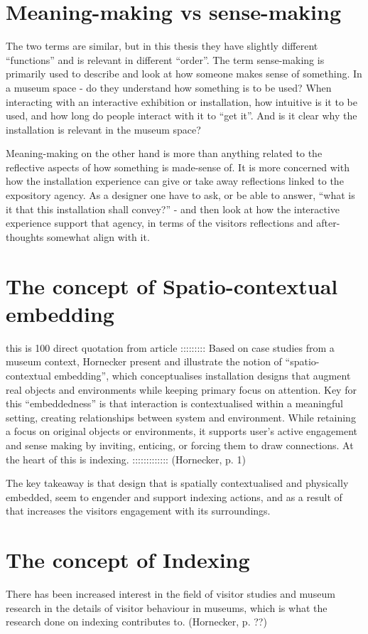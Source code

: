 \section{Meaning-making vs sense-making}
The two terms are similar, but in this thesis they have slightly different “functions” and is relevant in different “order”. The term sense-making is primarily used to describe and look at how someone makes sense of something. In a museum space - do they understand how something is to be used? When interacting with an interactive exhibition or installation, how intuitive is it to be used, and how long do people interact with it to “get it”. And is it clear why the installation is relevant in the museum space?

Meaning-making on the other hand is more than anything related to the reflective aspects of how something is made-sense of. It is more concerned with how the installation experience can give or take away reflections linked to the expository agency. As a designer one have to ask, or be able to answer, “what is it that this installation shall convey?” - and then look at how the interactive experience support that agency, in terms of the visitors reflections and after-thoughts somewhat align with it.

\section{The concept of Spatio-contextual embedding}


this is 100 direct quotation from article ::::::::: Based on case studies from a museum context, Hornecker present and illustrate the notion of “spatio-contextual embedding”, which conceptualises installation designs that augment real objects and environments while keeping primary focus on attention. Key for this “embeddedness” is that interaction is contextualised within a meaningful setting, creating relationships between system and environment. While retaining a focus on original objects or environments, it supports user’s active engagement and sense making by inviting, enticing, or forcing them to draw connections. At the heart of this is indexing. ::::::::::::: (Hornecker, p. 1)

The key takeaway is that design that is spatially contextualised and physically embedded, seem to engender and support indexing actions, and as a result of that increases the visitors engagement with its surroundings.


\section{The concept of Indexing}
There has been increased interest in the field of visitor studies and museum research in the details of visitor behaviour in museums, which is what the research done on indexing contributes to. (Hornecker, p. ??)

